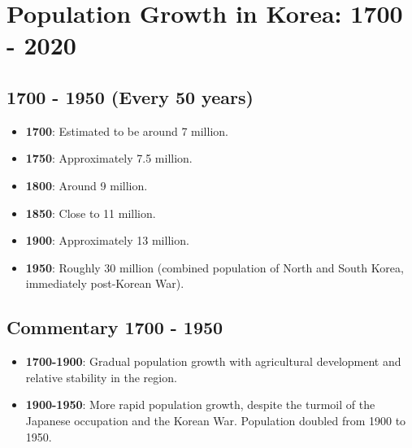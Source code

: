 \section{Population Growth in Korea: 1700 - 2020}

\subsection*{1700 - 1950 (Every 50 years)}
\begin{itemize}
    \item \textbf{1700}: Estimated to be around 7 million.
    \item \textbf{1750}: Approximately 7.5 million.
    \item \textbf{1800}: Around 9 million.
    \item \textbf{1850}: Close to 11 million.
    \item \textbf{1900}: Approximately 13 million.
    \item \textbf{1950}: Roughly 30 million (combined population of North and South Korea, immediately post-Korean War).
\end{itemize}

\subsection*{Commentary 1700 - 1950}
\begin{itemize}
    \item \textbf{1700-1900}: Gradual population growth with agricultural development and relative stability in the region.
    \item \textbf{1900-1950}: More rapid population growth, despite the turmoil of the Japanese occupation and the Korean War. Population doubled from 1900 to 1950.
\end{itemize}

